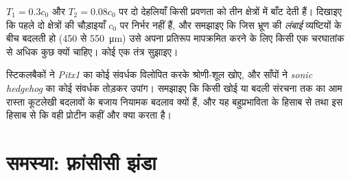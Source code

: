 \begin{exercise}[$\star\star\star$]\label{exo:b3:developmental-genetics:11}
$T_{1} = 0.3c_{0}$ और $T_{2} = 0.08c_{0}$ पर दो देहलियाँ किसी प्रवणता
को तीन क्षेत्रों में बाँट देती हैं। दिखाइए कि पहले दो क्षेत्रों की
चौड़ाइयाँ $c_{0}$ पर निर्भर नहीं हैं, और समझाइए कि जिस भ्रूण की
\emph{लंबाई} व्यष्टियों के बीच बदलती हो (\qty{450}{} से
\qty{550}{\micro m}) उसे अपना प्रतिरूप मापक्रमित करने के लिए किसी एक
चरघातांक से अधिक कुछ क्यों चाहिए। कोई एक तंत्र सुझाइए।
\end{exercise}

\begin{exercise}[$\star\star\star$]\label{exo:b3:developmental-genetics:12}
स्टिकलबैकों ने \emph{Pitx1} का कोई संवर्धक विलोपित करके श्रोणी-शूल खोए,
और साँपों ने \emph{sonic hedgehog} का कोई संवर्धक तोड़कर उपांग। समझाइए
कि किसी खोई या बदली संरचना तक का आम रास्ता कूटलेखी बदलावों के बजाय
नियामक बदलाव क्यों हैं, और यह बहुप्रभाविता के हिसाब से तथा इस हिसाब से
कि वही प्रोटीन कहीं और क्या करता है।
\end{exercise}

\section{समस्या: फ़्रांसीसी झंडा}

